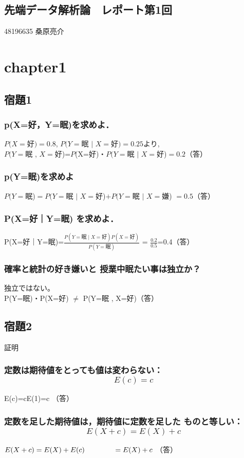 \documentclass{article}
\begin{document}
\begin{center}
\section*{先端データ解析論　レポート第1回}
48196635 桑原亮介
\end{center}
\section{chapter1}
\subsection{宿題1}
\subsubsection{p(X=好，Y=眠)を求めよ．}
$P(X=$好$)=0.8$, $P(Y=$眠 $\mid$ $X=$好$)=0.25$より,\\
$P(Y=$眠 , $X=$好)=$P$(X=好)・$P(Y=$眠 $\mid$ $X=$好)$=0.2$（答）\\
\subsubsection{ p(Y=眠)を求めよ}
$P(Y=$眠)$=P(Y=$眠 $\mid$ $X=$好)$+P(Y=$眠 $\mid$ $X=$嫌) $=0.5$（答）\\
\subsubsection{ P(X=好｜Y=眠) を求めよ．}
P(X=好｜Y=眠)=$\frac{P(Y=\mbox{眠}\mid X=\mbox{好})P(X=\mbox{好})}{P(Y=\mbox{眠})}$ = $\frac{0.2}{0.5}$=0.4（答）
\subsubsection{ 確率と統計の好き嫌いと 授業中眠たい事は独立か？}
独立ではない。\\
P(Y=眠)・P(X=好) $\neq$ P(Y=眠 , X=好)（答）

\subsection{宿題2}
証明\\
\subsubsection{定数は期待値をとっても値は変わらない：\[E(c)=c\]}
E(c)=cE(1)=c （答）
\subsubsection{定数を足した期待値は，期待値に定数を足した
ものと等しい：\[E(X+c)=E(X)+c\]}
$E(X+c)=E(X)+E(c)\\
\quad \quad \quad \quad=E(X)+c$ （答）
\end{document}
